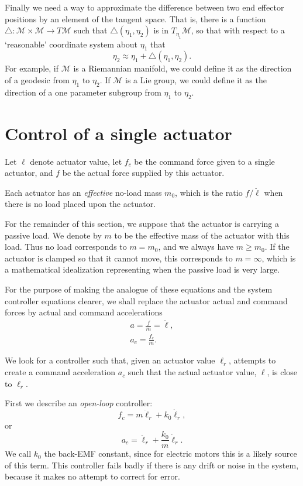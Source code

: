 \documentclass[oneside,twocolumn,reqno]{amsart}
\newcommand{\liediff}{\mathbin{\triangle}}
\begin{document}
Finally we need a way to approximate the difference between two end effector positions by an element of the tangent space.  That is, there is a function $\liediff: \mathcal M \times \mathcal M \to T \mathcal M$ such that $\liediff(\eta_1,\eta_2)$ is in $T_{\eta_1}\mathcal M$, so that with respect to a `reasonable' coordinate system about $\eta_1$ that
\begin{equation}
\label{lie diff approximation}
\eta_2 \approx \eta_1 + \liediff(\eta_1,\eta_2) .
\end{equation}
For example, if $\mathcal M$ is a Riemannian manifold, we could define it as the direction of a geodesic from $\eta_1$ to $\eta_2$.  If $\mathcal M$ is a Lie group, we could define it as the direction of a one parameter subgroup from $\eta_1$ to $\eta_2$.

\section{Control of a single actuator}
\label{control actuator}

Let $\ell$ denote actuator value, let $f_c$ be the command force given to a single actuator, and $f$ be the actual force supplied by this actuator.

Each actuator has an \emph{effective} no-load mass $m_0$, which is the ratio $f/\ddot \ell$ when there is no load placed upon the actuator.

For the remainder of this section, we suppose that the actuator is carrying a passive load.  We denote by $m$ to be the effective mass of the actuator with this load.  Thus no load corresponds to $m=m_0$, and we always have $m \ge m_0$.  If the actuator is clamped so that it cannot move, this corresponds to $m = \infty$, which is a mathematical idealization representing when the passive load is very large.

For the purpose of making the analogue of these equations and the system controller equations clearer, we shall replace the actuator actual and command forces by actual and command accelerations
\begin{gather}
a = \frac fm = \ddot \ell, \\
a_c = \frac {f_c}m .
\end{gather}

We look for a controller such that, given an actuator value $\ell_r$, attempts to create a command acceleration $a_c$ such that the actual actuator value, $\ell$, is close to $\ell_r$.

First we describe an \emph{open-loop} controller:
\begin{equation}
\label{pre approx open-loop}
f_c = m \ddot \ell_r + k_0 \dot \ell_r,
\end{equation}
or
\begin{equation}
\label{approx open-loop}
a_c = \ddot \ell_r + \frac{k_0}m \dot \ell_r.
\end{equation}
We call $k_0$ the back-EMF constant, since for electric motors this is a likely source of this term.  This controller fails badly if there is any drift or noise in the system, because it makes no attempt to correct for error.
\end{document}
